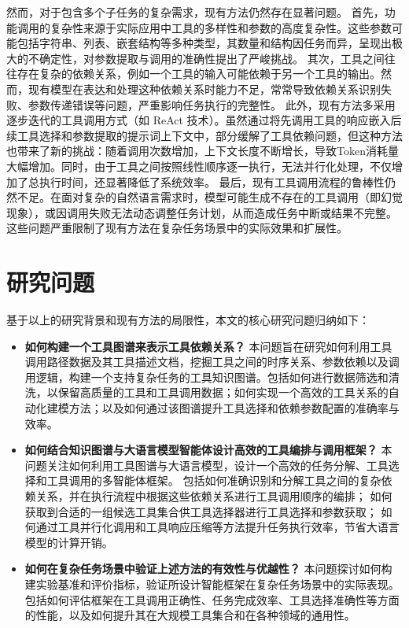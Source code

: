 
然而，对于包含多个子任务的复杂需求，现有方法仍然存在显著问题。
首先，功能调用的复杂性来源于实际应用中工具的多样性和参数的高度复杂性。这些参数可能包括字符串、列表、嵌套结构等多种类型，其数量和结构因任务而异，呈现出极大的不确定性\cite{Qin2023}，对参数提取与调用的准确性提出了严峻挑战。
其次，工具之间往往存在复杂的依赖关系，例如一个工具的输入可能依赖于另一个工具的输出。然而，现有模型在表达和处理这种依赖关系时能力不足，常常导致依赖关系识别失败、参数传递错误等问题，严重影响任务执行的完整性。
此外，现有方法多采用逐步迭代的工具调用方式（如 ReAct 技术\cite{Yao2023b}）。虽然通过将先调用工具的响应嵌入后续工具选择和参数提取的提示词上下文中，部分缓解了工具依赖问题，但这种方法也带来了新的挑战：随着调用次数增加，上下文长度不断增长，导致Token消耗量大幅增加。同时，由于工具之间按照线性顺序逐一执行，无法并行化处理，不仅增加了总执行时间，还显著降低了系统效率。
最后，现有工具调用流程的鲁棒性仍然不足。在面对复杂的自然语言需求时，模型可能生成不存在的工具调用（即幻觉现象），或因调用失败无法动态调整任务计划，从而造成任务中断或结果不完整。这些问题严重限制了现有方法在复杂任务场景中的实际效果和扩展性。

\section{研究问题}

基于以上的研究背景和现有方法的局限性，本文的核心研究问题归纳如下：
\begin{itemize}
    \item \textbf{如何构建一个工具图谱来表示工具依赖关系？}  
    本问题旨在研究如何利用工具调用路径数据及其工具描述文档，挖掘工具之间的时序关系、参数依赖以及调用逻辑，构建一个支持复杂任务的工具知识图谱。包括如何进行数据筛选和清洗，以保留高质量的工具和工具调用数据；如何实现一个高效的工具关系的自动化建模方法；以及如何通过该图谱提升工具选择和依赖参数配置的准确率与效率。
    
    \item \textbf{如何结合知识图谱与大语言模型智能体设计高效的工具编排与调用框架？}  
    本问题关注如何利用工具图谱与大语言模型，设计一个高效的任务分解、工具选择和工具调用的多智能体框架。
    包括如何准确识别和分解工具之间的复杂依赖关系，并在执行流程中根据这些依赖关系进行工具调用顺序的编排；
    如何获取到合适的一组候选工具集合供工具选择器进行工具选择和参数获取；
    如何通过工具并行化调用和工具响应压缩等方法提升任务执行效率，节省大语言模型的计算开销。
    
    \item \textbf{如何在复杂任务场景中验证上述方法的有效性与优越性？}  
    本问题探讨如何构建实验基准和评价指标，验证所设计智能框架在复杂任务场景中的实际表现。包括如何评估框架在工具调用正确性、任务完成效率、工具选择准确性等方面的性能，以及如何提升其在大规模工具集合和在各种领域的通用性。
\end{itemize}

